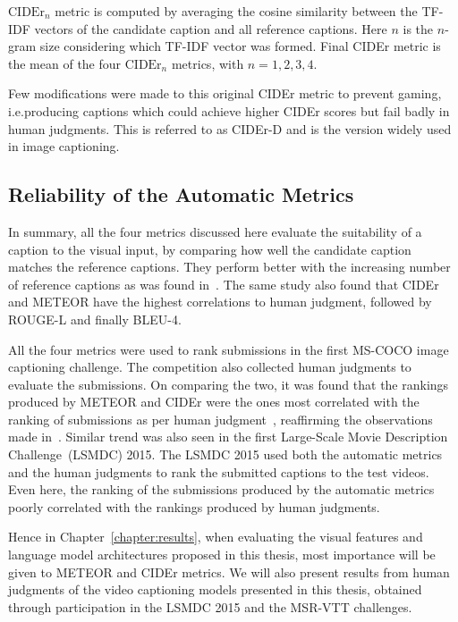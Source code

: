 $\text{CIDEr}_n$ metric is computed by averaging the cosine similarity between
the TF-IDF vectors of the candidate caption and all reference captions.
Here $n$ is the $n$-gram size considering which TF-IDF vector was formed.
Final CIDEr metric is the mean of the four $\text{CIDEr}_n$ metrics, with $n=1,2,3,4$.

Few modifications were made to this original CIDEr metric to prevent gaming,
i.e.\@ producing captions which could achieve higher CIDEr scores but fail badly
in human judgments.
This is referred to as CIDEr-D and is the version widely used in image
captioning.

\subsection{Reliability of the Automatic Metrics}
\label{subsec:autMetRel}
In summary, all the four metrics discussed here evaluate the suitability of a
caption to the visual input, by comparing how well the candidate caption
matches the reference captions.
They perform better with the increasing number of reference captions as was
found in~\cite{Vedantam_2015_CVPR}.
The same study also found that CIDEr and METEOR have the highest correlations
to human judgment, followed by ROUGE-L and finally BLEU-4.

All the four metrics were used to rank submissions in the first MS-COCO
image captioning challenge.
The competition also collected human judgments to evaluate the submissions.
%
On comparing the two, it was found that the rankings produced by METEOR and
CIDEr were the ones most correlated with the ranking of submissions as per human
judgment~\cite{lsun2015CaptionSlides}, reaffirming the observations made
in~\cite{Vedantam_2015_CVPR}.
Similar trend was also seen in the first Large-Scale Movie Description
Challenge~(LSMDC) 2015.
The LSMDC 2015 used both the automatic metrics and the human judgments
to rank the submitted captions to the test videos.
Even here, the ranking of the submissions produced by the automatic metrics
poorly correlated with the rankings produced by human judgments.

Hence in Chapter~\ref{chapter:results}, when evaluating the visual features and
language model architectures proposed in this thesis, most importance will be
given to METEOR and CIDEr metrics.
We will also present results from human judgments of the video captioning
models presented in this thesis, obtained through participation in the LSMDC
2015 and the MSR-VTT challenges.

